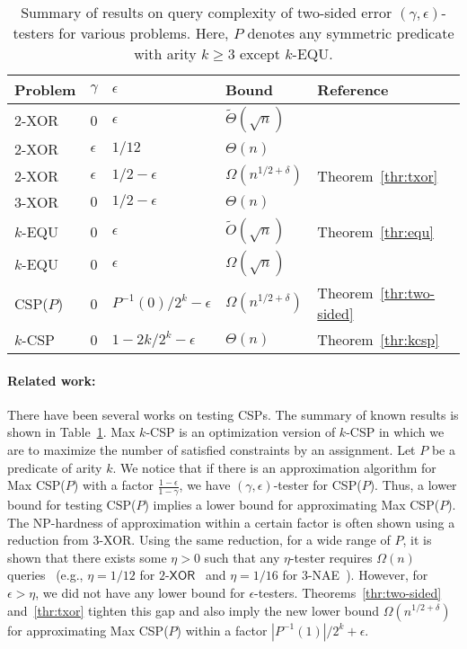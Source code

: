\documentclass[letterpaper,11pt]{article}
\newcommand{\kcsp}{\textsf{$k$-CSP}\xspace}
\newcommand{\csp}[1]{\textsf{CSP}(#1)\xspace}
\newcommand{\xor}{\textsf{XOR}\xspace}
\newcommand{\nae}{\textsf{NAE}\xspace}
\newcommand{\txor}{\textsf{$2$-XOR}\xspace}
\newcommand{\kequ}{$k$-\textsf{EQU}\xspace}
\newcommand{\maxcsp}[1]{\textsf{Max CSP}(#1)\xspace}
\newcommand{\maxkcsp}{\textsf{Max $k$-CSP}\xspace}
\begin{document}
\begin{table}[t]
  \caption{Summary of results on query complexity of two-sided error $(\gamma,\epsilon)$-testers for various problems. Here, $P$ denotes any symmetric predicate with arity $k\geq 3$ except \kequ.}
  \label{tbl:summary}
  \begin{center}
    \begin{tabular}{|l|l|l|l|l|}
      \hline
      Problem & $\gamma$ & $\epsilon$ & Bound & Reference \\
      \hline
      \txor & 0 & $\epsilon$ & $\tilde{\Theta}(\sqrt{n})$ & \cite{GR99,GR08}\\ 
      \hline
      \txor & $\epsilon$ & $1/12$ & $\Theta(n)$ & \cite{YI10}\\
      \hline
      \txor & $\epsilon$ & $1/2-\epsilon$ & $\Omega(n^{1/2+\delta})$ & Theorem~\ref{thr:txor} \\
      \hline
      $3$-\xor & $0$ & $1/2-\epsilon$ & $\Theta(n)$ & \cite{BOT02} \\
      \hline
      \kequ & 0 & $\epsilon$ & $\tilde{O}(\sqrt{n})$ & Theorem~\ref{thr:equ}\\
      \hline
      \kequ& 0 & $\epsilon$ & $\Omega(\sqrt{n})$ & \cite{GR08} \\
      \hline
      \csp{$P$} & 0 & $P^{-1}(0)/2^k-\epsilon$ & $\Omega(n^{1/2+\delta})$ & Theorem~\ref{thr:two-sided} \\
      \hline
      \kcsp & 0 & $1-2k/2^k-\epsilon$ & $\Theta(n)$ & Theorem~\ref{thr:kcsp} \\
      \hline
    \end{tabular}
  \end{center}
\end{table}

\paragraph{Related work:}
There have been several works on testing CSPs.
The summary of known results is shown in Table~\ref{tbl:summary}.
\maxkcsp is an optimization version of \kcsp in which we are to maximize the number of satisfied constraints by an assignment.
Let $P$ be a predicate of arity $k$.
We notice that if there is an approximation algorithm for \maxcsp{$P$} with a factor $\frac{1-\epsilon}{1-\gamma}$,
we have $(\gamma,\epsilon)$-tester for \csp{$P$}.
Thus, a lower bound for testing \csp{$P$} implies a lower bound for approximating \maxcsp{$P$}.
The NP-hardness of approximation within a certain factor is often shown using a reduction from $3$-\xor.
Using the same reduction, 
for a wide range of $P$,
it is shown that there exists some $\eta>0$ such that any $\eta$-tester requires $\Omega(n)$ queries~\cite{YI10} (e.g., $\eta=1/12$ for $\txor$~\cite{Has01} and $\eta=1/16$ for $3$-\nae~\cite{Zwi98}).
However, for $\epsilon>\eta$,
we did not have any lower bound for $\epsilon$-testers.
Theorems~\ref{thr:two-sided} and~\ref{thr:txor} tighten this gap and also imply the new lower bound $\Omega(n^{1/2+\delta})$ for approximating \maxcsp{$P$} within a factor $|P^{-1}(1)|/2^k+\epsilon$.
\end{document}
